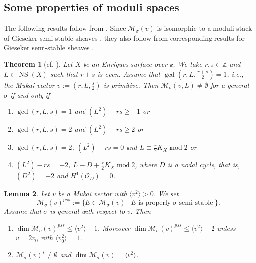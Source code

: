 \documentclass[leqno,11pt]{amsart}
\def\dim{\mathop{\mathrm{dim}}\nolimits}
\def\mod{\mathop{\mathrm{mod}}\nolimits}
\def\NS{\mathop{\mathrm{NS}}\nolimits}
\newtheorem{Thm}{Theorem}[section]
\newtheorem{Lem}[Thm]{Lemma}
\theoremstyle{definition}
\def\MM{\ensuremath{\mathcal M}}
\def\cal{\mathcal}
\def\Bbb{\mathbb}
\begin{document}
{\subsection{Some properties of moduli spaces}

The following results follow from \cite{Nue14a}. 
Since $\MM_\sigma(v)$ is isomorphic to a moduli stack of Gieseker semi-stable
sheaves \cite{Yos16b}, they also follow from corresponding results for
Gieseker semi-stable sheaves \cite{Yos16a}.

\begin{Thm}[{cf. \cite[Thm. 6.12]{Nue14a}}]\label{Thm:exist:nodal}
Let $X$ be an Enriques surface over $k$.
We take $r,s \in {\Bbb Z}$ and $L \in \NS(X)$ such
that $r+s$ is even.
Assume that 
$\gcd(r,L,\frac{r+s}{2})=1$, i.e., the Mukai vector $v:=(r,L,\frac{s}{2})$
is primitive.
Then
$\MM_\sigma(v,L) \ne \emptyset$ for a general $\sigma$
if and only if
\begin{enumerate}
\item
$\gcd(r,L,s)=1$ and $(L^2)-rs \geq -1$ or 
\item 
$\gcd(r,L,s)=2$ and $(L^2)-rs \geq 2$ 
or 
\item
$\gcd(r,L,s)=2$,
$(L^2)-rs =0$ and $L \equiv \frac{r}{2}K_X \mod 2$ or
\item
$(L^2)-rs =-2$,
$L \equiv D+\frac{r}{2}K_X \mod 2$, where 
$D$ is a nodal cycle, that is, $(D^2)=-2$ and $H^1({\cal O}_D)=0$.
\end{enumerate}
\end{Thm}




\begin{Lem}\label{lem:pss}
Let $v$ be a Mukai vector with $\langle v^2 \rangle>0$.
We set
\begin{equation}
\MM_\sigma(v)^{pss}:=\{E \in \MM_\sigma(v) \mid
\text{$E$ is properly $\sigma$-semi-stable }\}.
\end{equation}
Assume that $\sigma$ is general with respect to $v$.
Then
\begin{enumerate}
\item[(1)]
$\dim \MM_\sigma(v)^{pss} \leq \langle v^2 \rangle-1$.
Moreover $\dim \MM_\sigma(v)^{pss} \leq \langle v^2 \rangle-2$ unless
$v=2v_0$ with $\langle v_0^2 \rangle=1$.
 \item[(2)]
$\MM_\sigma(v)^{s} \ne \emptyset$ and 
$\dim \MM_\sigma(v)=\langle v^2 \rangle$.
\end{enumerate}
\end{Lem}



}
\end{document}
